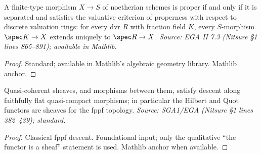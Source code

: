 \begin{theorem}\leanok{}
  \label{thm:valuative-criterion-properness}
  A finite-type morphism $X\to S$ of noetherian schemes is proper if and only if
  it is separated and satisfies the valuative criterion of properness with
  respect to discrete valuation rings: for every dvr $R$ with fraction field $K$,
  every $S$-morphism $\spec K\to X$ extends uniquely to $\spec R\to X$.
  \textit{Source: EGA II 7.3 (Nitsure §1 lines 865--891); available in Mathlib.}
\end{theorem}

\begin{proof}
  Standard; available in Mathlib's algebraic geometry library. Mathlib anchor.
\end{proof}

\begin{theorem}
  \label{thm:ffdescent}
  Quasi-coherent sheaves, and morphisms between them, satisfy descent along
  faithfully flat quasi-compact morphisms; in particular the Hilbert and Quot
  functors are sheaves for the fppf topology.
  \textit{Source: SGA1/EGA (Nitsure §1 lines 382--439); standard.}
\end{theorem}

\begin{proof}
  Classical fppf descent. Foundational input; only the qualitative ``the functor
  is a sheaf'' statement is used. Mathlib anchor when available.
\end{proof}
